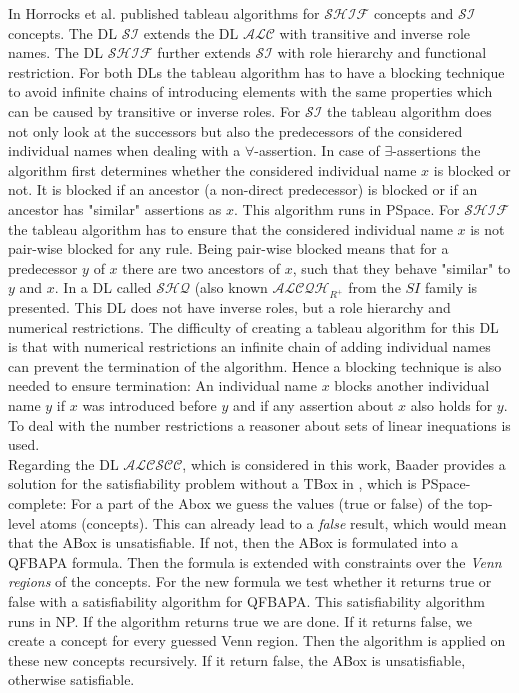 \documentclass{book}
\theoremstyle{break}
\theoremstyle{definition}
\begin{document}
In \cite{2} Horrocks et al. published tableau algorithms for $\mathcal{SHIF}$ concepts and $\mathcal{SI}$ concepts. The DL $\mathcal{SI}$ extends the DL $\mathcal{ALC}$ with transitive and inverse role names. The DL $\mathcal{SHIF}$ further extends $\mathcal{SI}$ with role hierarchy and functional restriction. For both DLs the tableau algorithm has to have a blocking technique to avoid infinite chains of introducing elements with the same properties which can be caused by transitive or inverse roles. For $\mathcal{SI}$ the tableau algorithm does not only look at the successors but also the predecessors of the considered individual names when dealing with a $\forall$-assertion. In case of $\exists$-assertions the algorithm first determines whether the considered individual name $x$ is blocked or not. It is blocked if an ancestor (a non-direct predecessor) is blocked or if an ancestor has "similar" assertions as $x$. This algorithm runs in PSpace. For $\mathcal{SHIF}$ the tableau algorithm has to ensure that the considered individual name $x$ is not pair-wise blocked for any rule. Being pair-wise blocked means that for a predecessor $y$ of $x$ there are two ancestors of $x$, such that they behave "similar" to $y$ and $x$. In \cite{alcqh} a DL called $\mathcal{SHQ}$ (also known $\mathcal{ALCQH}_{R^+}$ from the $SI$ family is presented. This DL does not have inverse roles, but a role hierarchy and numerical restrictions. The difficulty of creating a tableau algorithm for this DL is that with numerical restrictions an infinite chain of adding individual names can prevent the termination of the algorithm. Hence a blocking technique is also needed to ensure termination: An individual name $x$ blocks another individual name $y$ if $x$ was introduced before $y$ and if any assertion about $x$ also holds for $y$. To deal with the number restrictions a reasoner about sets of linear inequations is used.\\
Regarding the DL $\mathcal{ALCSCC}$, which is considered in this work, Baader provides a solution for the satisfiability problem without a TBox in \cite{4}, which is PSpace-complete: For a part of the Abox we guess the values (true or false) of the top-level atoms (concepts). This can already lead to a \textit{false} result, which would mean that the ABox is unsatisfiable. If not, then the ABox is formulated into a QFBAPA formula. Then the formula is extended with constraints over the \textit{Venn regions} of the concepts. For the new formula we test whether it returns true or false with a satisfiability algorithm for QFBAPA. This satisfiability algorithm runs in NP. If the algorithm returns true we are done. If it returns false, we create a concept for every guessed Venn region. Then the algorithm is applied on these new concepts recursively. If it return false, the ABox is unsatisfiable, otherwise satisfiable.
\end{document}
